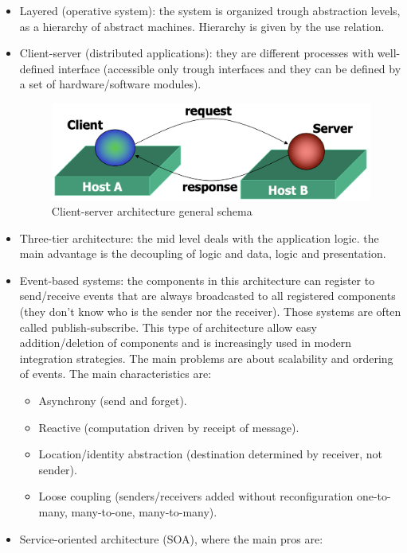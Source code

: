 \documentclass[12pt, a4paper]{report}
\newtheorem[style=M,bodystyle=\normalfont]{theorem}{Theorem}
\newtheorem[style=M,bodystyle=\normalfont]{corollary}{Corollary}
\newtheorem[style=M,bodystyle=\normalfont]{lemma}{Lemma}
\newtheorem[style=M,bodystyle=\normalfont]{definition}{Definition}
\begin{document}
    \begin{itemize}
        \item Layered (operative system): the system is organized trough abstraction levels, as a hierarchy of abstract machines. Hierarchy is given by the use relation.
        \item Client-server (distributed applications): they are different processes with well-defined interface (accessible only trough interfaces and they can be defined by a set of hardware/software modules).
        \begin{figure}
            \centering
            \includegraphics[width=0.5\linewidth]{images/clientserver.png}
            \caption{Client-server architecture general schema}
        \end{figure}
        \item Three-tier architecture: the mid level deals with the application logic. the main advantage is the decoupling of logic and data, logic and presentation.
        \item Event-based systems: the components in this architecture can register to send/receive events that are always broadcasted to all registered components (they don't know who is the sender nor the receiver). Those systems are often called publish-subscribe. This type of architecture allow easy addition/deletion of components and is increasingly used in modern integration strategies. The main problems are about scalability and ordering of events. The main characteristics are: 
        \begin{itemize}
            \item Asynchrony (send and forget).
            \item Reactive (computation driven by receipt of message).
            \item Location/identity abstraction (destination determined by receiver, not sender). 
            \item Loose coupling (senders/receivers added without reconfiguration one-to-many, many-to-one, many-to-many).
        \end{itemize}
        \item Service-oriented architecture (SOA), where the main pros are: 
        \begin{itemize}

\end{itemize}
\end{itemize}
\end{document}

